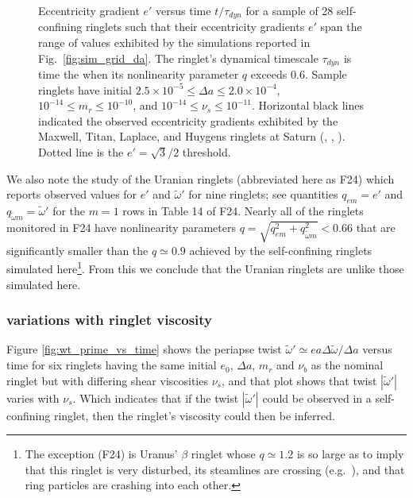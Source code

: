 \documentclass[preprint]{aastex62}
\begin{document}
\begin{figure}
    \caption{
        \label{fig:e_prime_q_vs_time}
        Eccentricity gradient $e'$ versus time $t/\tau_{dyn}$ for a sample of 28 self-confining
        ringlets such that their eccentricity gradients $e'$ span the range of values
        exhibited by the simulations reported in Fig.\ \ref{fig:sim_grid_da}. 
        The ringlet's dynamical timescale $\tau_{dyn}$ is time the when its nonlinearity parameter $q$ exceeds $0.6$.
        Sample ringlets have initial $2.5\times10^{-5}\le\Delta a\le2.0\times10^{-4}$,
        $10^{-14}\le m_r\le10^{-10}$, and $10^{-14}\le \nu_s\le10^{-11}$.
        Horizontal black lines indicated the observed eccentricity gradients 
        exhibited by the Maxwell, Titan, Laplace, and Huygens ringlets at Saturn 
        (\citealt{Netal14}, \citealt{Fetal16}, \citealt{SH16}). Dotted line is the $e'=\sqrt{3}/2$ threshold.
    }
\end{figure}

We also note the \cite{Fetal24} study of the Uranian ringlets (abbreviated here as F24)
which reports observed values for $e'$ and $\tilde{\omega}'$
for nine ringlets; see quantities $q_{em}=e'$ and $q_{\tilde{\omega}m}=\tilde{\omega}'$ for
the $m=1$ rows in Table 14 of F24. Nearly all of the ringlets monitored in F24 have 
nonlinearity parameters $q=\sqrt{q_{em}^2 + q_{\tilde{\omega}m}^2}<0.66$ that are significantly
smaller than the $q\simeq0.9$ achieved by the self-confining ringlets simulated 
here\footnote{The exception (F24) is Uranus' $\beta$ ringlet whose $q\simeq1.2$ is so large as to imply that
this ringlet is very disturbed, its steamlines are crossing (e.g.\ \citealt{BGT82}),
and that ring particles are crashing into each other.}. 
From this we conclude that the Uranian ringlets are unlike those simulated here.


\subsubsection{variations with ringlet viscosity}
\label{subsec:viscosity-variations}

Figure \ref{fig:wt_prime_vs_time} shows the periapse twist $\tilde{\omega}' \simeq ea\Delta\tilde{\omega}/\Delta a$ 
versus time for six ringlets
having the same initial $e_0$, $\Delta a$, $m_r$ and $\nu_b$ as the nominal ringlet but with differing shear
viscosities $\nu_s$, and that plot shows that twist $|\tilde{\omega}'|$ varies with $\nu_s$. Which indicates that if 
the twist $|\tilde{\omega}'|$ could be observed in a self-confining ringlet, then 
the ringlet's viscosity could then be inferred. 
\end{document}
